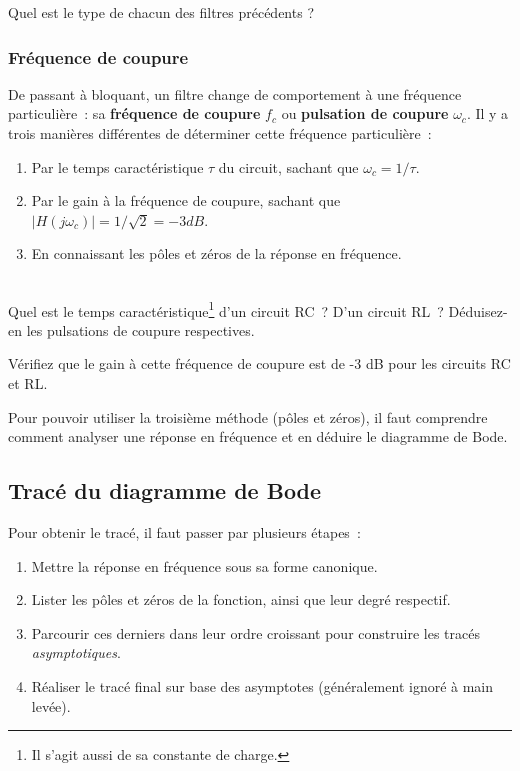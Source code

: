 {
Quel est le type de chacun des filtres précédents ?
}
{}

\subsubsection{Fréquence de coupure}
De passant à bloquant, un filtre change de comportement à une fréquence particulière~: sa \textbf{fréquence de coupure} $f_c$ ou \textbf{pulsation de coupure} $\omega_c$.
Il y a trois manières différentes de déterminer cette fréquence particulière~:
\begin{enumerate}
  \item Par le temps caractéristique $\tau$ du circuit, sachant que $\omega_c = 1/\tau$.
  \item Par le gain à la fréquence de coupure, sachant que $|H(j\omega_c)| = 1/\sqrt{2} = -3 dB$.
  \item En connaissant les pôles et zéros de la réponse en fréquence.
\end{enumerate}
~\\

{
Quel est le temps caractéristique\footnote{Il s'agit aussi de sa constante de charge.} d'un circuit RC~? D'un circuit RL~?
Déduisez-en les pulsations de coupure respectives.
}
{}

{
Vérifiez que le gain à cette fréquence de coupure est de -3 dB pour les circuits RC et RL.
}
{}

Pour pouvoir utiliser la troisième méthode (pôles et zéros), il faut comprendre comment analyser une réponse en fréquence et en déduire le diagramme de Bode.

\subsection{Tracé du diagramme de Bode}

Pour obtenir le tracé, il faut passer par plusieurs étapes~:
\begin{enumerate}
  \item Mettre la réponse en fréquence sous sa forme canonique.
  \item Lister les pôles et zéros de la fonction, ainsi que leur degré respectif.
  \item Parcourir ces derniers dans leur ordre croissant pour construire les tracés \textit{asymptotiques}.
  \item Réaliser le tracé final sur base des asymptotes (généralement ignoré à main levée).
\end{enumerate}

